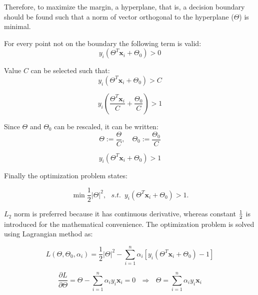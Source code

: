\documentclass{article}
\begin{document}
\noindent Therefore, to maximize the margin, a hyperplane, that is, a decision boundary should be found such that a norm of vector orthogonal to the hyperplane ($\Theta$) is minimal. 

For every point not on the boundary the following term is valid:
\begin{equation} 
y_i \left(\Theta^T \mathbf{x}_i + \Theta_0\right) > 0 
\end{equation}

Value $C$ can be selected such that:
\begin{equation} 
y_i \left(\Theta^T \mathbf{x}_i + \Theta_0\right) > C
\end{equation}

\begin{equation} 
y_i \left(\frac{\Theta^T \mathbf{x}_i}{C} + \frac{\Theta_0}{C}\right) > 1
\end{equation}

Since $\Theta$ and $\Theta_0$ can be rescaled, it can be written:
\begin{equation} 
\Theta := \frac{\Theta}{C}, \,\,\,\,\,\, \Theta_0 := \frac{\Theta_0}{C}
\end{equation}

\begin{equation} 
 y_i \left(\Theta^T \mathbf{x}_i + \Theta_0\right) > 1
\end{equation}

Finally the optimization problem states:

\begin{equation} 
\min \frac{1}{2} \vert \Theta \vert ^2, \,\,\,\, s.t. \,\,\, y_i \left(\Theta^T \mathbf{x}_i + \Theta_0\right) > 1.
\end{equation}

\noindent $L_2$ norm is preferred because it has continuous derivative, whereas constant $\nicefrac{1}{2}$ is introduced for the mathematical convenience. The optimization problem is solved using Lagrangian method as:

\begin{equation} \label{eq:SVM-opt}
L(\Theta, \Theta_0, \alpha_i) = \frac{1}{2} \vert \Theta \vert ^2 - \sum_{i=1}^n \alpha_i \left[y_i \left(\Theta^T \mathbf{x}_i + \Theta_0\right) - 1\right]
\end{equation}

\begin{equation} \label{eq:SVM-primal}
\frac{\partial L}{\partial \Theta} = \Theta - \sum_{i=1}^n \alpha_i y_i \mathbf{x}_i = 0 \,\,\,\, \Rightarrow \,\,\,\, \Theta = \sum_{i=1}^n \alpha_i y_i \mathbf{x}_i
\end{equation}
\end{document}
